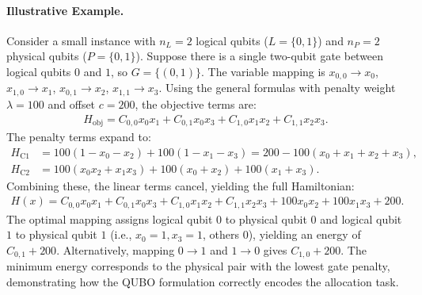 \documentclass[12pt]{article}
\begin{document}
\paragraph{Illustrative Example.}
Consider a small instance with $n_L = 2$ logical qubits ($L = \{0,1\}$) and $n_P = 2$ physical qubits ($P = \{0,1\}$). Suppose there is a single two-qubit gate between logical qubits $0$ and $1$, so $G = \{(0,1)\}$. The variable mapping is $x_{0,0} \to x_0$, $x_{1,0} \to x_1$, $x_{0,1} \to x_2$, $x_{1,1} \to x_3$. Using the general formulas with penalty weight $\lambda = 100$ and offset $c = 200$, the objective terms are:
\begin{align}
H_{\text{obj}} = C_{0,0} x_0 x_1 + C_{0,1} x_0 x_3 + C_{1,0} x_1 x_2 + C_{1,1} x_2 x_3.
\end{align}
The penalty terms expand to:
\begin{align}
H_{\text{C1}} &= 100(1 - x_0 - x_2) + 100(1 - x_1 - x_3) = 200 - 100(x_0 + x_1 + x_2 + x_3), \\
H_{\text{C2}} &= 100(x_0 x_2 + x_1 x_3) + 100(x_0 + x_2) + 100(x_1 + x_3).
\end{align}
Combining these, the linear terms cancel, yielding the full Hamiltonian:
\begin{align}
H(x) = C_{0,0} x_0 x_1 + C_{0,1} x_0 x_3 + C_{1,0} x_1 x_2 + C_{1,1} x_2 x_3 + 100 x_0 x_2 + 100 x_1 x_3 + 200.
\end{align}
The optimal mapping assigns logical qubit $0$ to physical qubit $0$ and logical qubit $1$ to physical qubit $1$ (i.e., $x_0=1, x_3=1$, others $0$), yielding an energy of $C_{0,1} + 200$. Alternatively, mapping $0 \to 1$ and $1 \to 0$ gives $C_{1,0} + 200$. The minimum energy corresponds to the physical pair with the lowest gate penalty, demonstrating how the QUBO formulation correctly encodes the allocation task.
\end{document}
